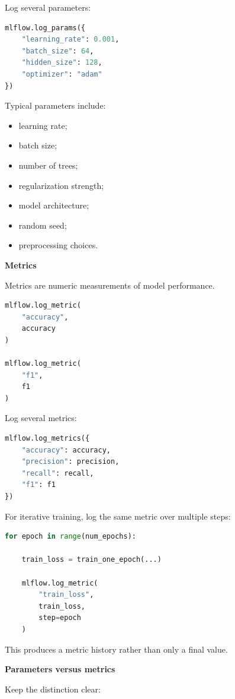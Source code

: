 \documentclass[11pt,letterpaper]{article}
\begin{document}
Log several parameters:

\begin{lstlisting}[language=Python]
mlflow.log_params({
    "learning_rate": 0.001,
    "batch_size": 64,
    "hidden_size": 128,
    "optimizer": "adam"
})
\end{lstlisting}

Typical parameters include:

\begin{itemize}[leftmargin=*]
    \item learning rate;
    \item batch size;
    \item number of trees;
    \item regularization strength;
    \item model architecture;
    \item random seed;
    \item preprocessing choices.
\end{itemize}

\textbf{Metrics}

Metrics are numeric measurements of model performance.

\begin{lstlisting}[language=Python]
mlflow.log_metric(
    "accuracy",
    accuracy
)

mlflow.log_metric(
    "f1",
    f1
)
\end{lstlisting}

Log several metrics:

\begin{lstlisting}[language=Python]
mlflow.log_metrics({
    "accuracy": accuracy,
    "precision": precision,
    "recall": recall,
    "f1": f1
})
\end{lstlisting}

For iterative training, log the same metric over multiple steps:

\begin{lstlisting}[language=Python]
for epoch in range(num_epochs):

    train_loss = train_one_epoch(...)

    mlflow.log_metric(
        "train_loss",
        train_loss,
        step=epoch
    )
\end{lstlisting}

This produces a metric history rather than only a final value.

\textbf{Parameters versus metrics}

Keep the distinction clear:
\end{document}
